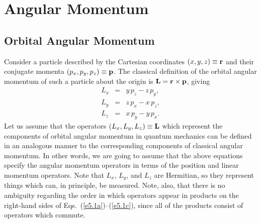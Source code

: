 \chapter{Angular Momentum}\label{s5}
\section{Orbital Angular Momentum}\label{s5.1}
Consider a particle described by the Cartesian coordinates 
$(x, y, z)\equiv {\bf r}$
 and their conjugate momenta $(p_x, p_y, p_z)\equiv {\bf p}$. The classical
definition of the orbital angular momentum of such a particle about the
origin is ${\bf L} = {\bf r}\times{\bf p}$, giving
\begin{eqnarray}\label{e5.1a}
L_x &=& y\, p_z - z\, p_y,\\[0.5ex]
L_y &=& z\, p_x - x\, p_z,\\[0.5ex]
L_z &=& x\,p_y - y \,p_x.\label{e5.1c}
\end{eqnarray}
Let us assume that the operators $(L_x, L_y, L_z)\equiv {\bf L}$ which
represent the components of
orbital angular momentum in quantum mechanics can be defined in
an analogous manner to the corresponding components of
classical angular momentum. In other words, we are 
going to assume that the above equations specify  the angular momentum operators
in terms of the position and linear momentum operators. Note that $L_x$, $L_y$,
and $L_z$ are Hermitian, so they represent things which can, in principle,
be measured. Note, also, that there is no ambiguity regarding the order
in which operators appear in products on the right-hand sides of Eqs.~(\ref{e5.1a})--(\ref{e5.1c}),
since all of the products consist of operators which commute. 

